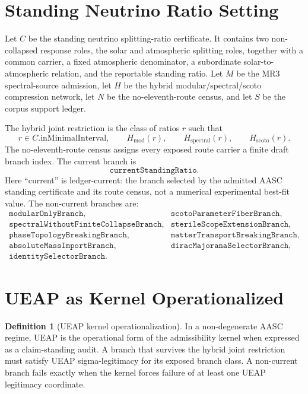 \documentclass[11pt]{article}
\theoremstyle{definition}
\newtheorem{definition}{Definition}
\begin{document}
\section{Standing Neutrino Ratio Setting}

Let \(C\) be the standing neutrino splitting-ratio certificate. It contains
two non-collapsed response roles, the solar and atmospheric splitting roles,
together with a common carrier, a fixed atmospheric denominator, a subordinate
solar-to-atmospheric relation, and the reportable standing ratio. Let \(M\)
be the MR3 spectral-source admission, let \(H\) be the hybrid
modular/spectral/scoto compression network, let \(N\) be the no-eleventh-route
census, and let \(S\) be the corpus support ledger.

The hybrid joint restriction is the class of ratios \(r\) such that
\[
 r \in C.\mathrm{inMinimalInterval},\qquad
 H_{\mathrm{mod}}(r),\qquad
 H_{\mathrm{spectral}}(r),\qquad
 H_{\mathrm{scoto}}(r).
\]
The no-eleventh-route census assigns every exposed route carrier a finite
draft branch index. The current branch is
\[
\texttt{currentStandingRatio}.
\]
Here ``current'' is ledger-current: the branch selected by the admitted AASC
standing certificate and its route census, not a numerical experimental
best-fit value.
The non-current branches are:
\[
\begin{array}{ll}
\texttt{modularOnlyBranch}, &
\texttt{scotoParameterFiberBranch},\\
\texttt{spectralWithoutFiniteCollapseBranch}, &
\texttt{sterileScopeExtensionBranch},\\
\texttt{phaseTopologyBreakingBranch}, &
\texttt{matterTransportBreakingBranch},\\
\texttt{absoluteMassImportBranch}, &
\texttt{diracMajoranaSelectorBranch},\\
\texttt{identitySelectorBranch}. &
\end{array}
\]

\section{UEAP as Kernel Operationalized}

\begin{definition}[UEAP kernel operationalization]
In a non-degenerate AASC regime, UEAP is the operational form of the
admissibility kernel when expressed as a claim-standing audit. A branch that
survives the hybrid joint restriction must satisfy UEAP sigma-legitimacy for
its exposed branch class. A non-current branch fails exactly when the kernel
forces failure of at least one UEAP legitimacy coordinate.
\end{definition}
\end{document}
